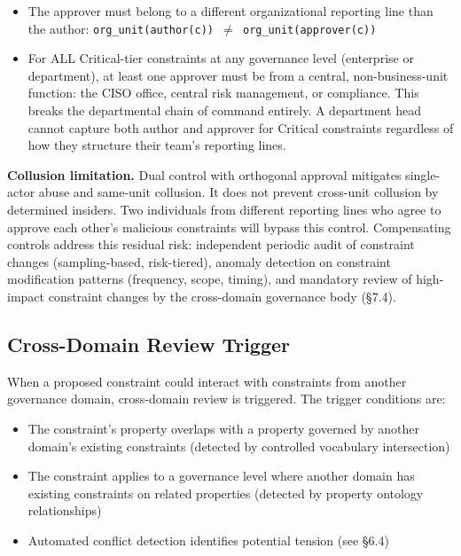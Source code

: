 \begin{itemize}
  \item The approver must belong to a different organizational reporting line than the author: \texttt{org\_\allowbreak{}unit(author(c)) $\neq$ org\_\allowbreak{}unit(approver(c))}
  \item For ALL Critical-tier constraints at any governance level (enterprise or department), at least one approver must be from a central, non-business-unit function: the CISO office, central risk management, or compliance. This breaks the departmental chain of command entirely. A department head cannot capture both author and approver for Critical constraints regardless of how they structure their team's reporting lines.
\end{itemize}


\textbf{Collusion limitation.} Dual control with orthogonal approval mitigates single-actor abuse and same-unit collusion. It does not prevent cross-unit collusion by determined insiders. Two individuals from different reporting lines who agree to approve each other's malicious constraints will bypass this control. Compensating controls address this residual risk: independent periodic audit of constraint changes (sampling-based, risk-tiered), anomaly detection on constraint modification patterns (frequency, scope, timing), and mandatory review of high-impact constraint changes by the cross-domain governance body (\S{}7.4).

\subsection{Cross-Domain Review Trigger}


When a proposed constraint could interact with constraints from another governance domain, cross-domain review is triggered. The trigger conditions are:

\begin{itemize}
  \item The constraint's property overlaps with a property governed by another domain's existing constraints (detected by controlled vocabulary intersection)
  \item The constraint applies to a governance level where another domain has existing constraints on related properties (detected by property ontology relationships)
  \item Automated conflict detection identifies potential tension (see \S{}6.4)
\end{itemize}


